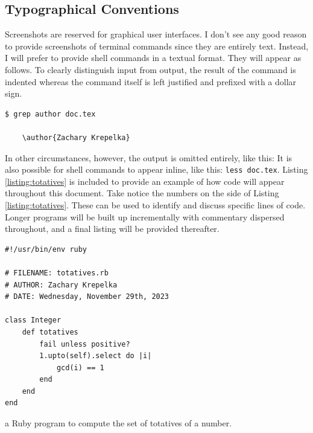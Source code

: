 \documentclass{article}
\begin{document}

\subsection*{Typographical Conventions}

Screenshots are reserved for graphical user interfaces.  I don't see any good
reason to provide screenshots of terminal commands since they are entirely text.
Instead, I will prefer to provide shell commands in a textual format. They will
appear as follows.  To clearly distinguish input from output, the result of the
command is indented whereas the command itself is left justified and prefixed
with a dollar sign.
%
\begin{verbatim}
$ grep author doc.tex

	\author{Zachary Krepelka}
\end{verbatim}
%
In other circumstances, however, the output is omitted entirely, like this:
%
It is also possible for shell commands to appear inline, like this:
\texttt{less doc.tex}.  Listing \ref{listing:totatives} is included to
provide an example of how code will appear throughout this document.  Take
notice the numbers on the side of Listing \ref{listing:totatives}. These can be
used to identify and discuss specific lines of code. Longer programs will be
built up incrementally with commentary dispersed throughout, and a final listing
will be provided thereafter.

\begin{listing}[h]
\begin{verbatim}
#!/usr/bin/env ruby

# FILENAME: totatives.rb
# AUTHOR: Zachary Krepelka
# DATE: Wednesday, November 29th, 2023

class Integer
    def totatives
        fail unless positive?
        1.upto(self).select do |i|
            gcd(i) == 1
        end
    end
end
\end{verbatim}
\caption{a Ruby program to compute the set of totatives of a number.}
\label{listing:totatives}
\end{listing}

\end{document}
